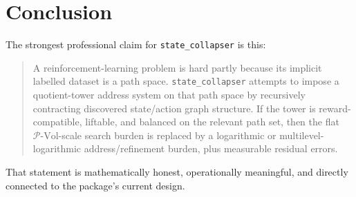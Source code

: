 \documentclass[11pt]{article}
\newcommand{\PVol}{\mathcal{P}\text{-}\mathrm{Vol}}
\begin{document}
\section{Conclusion}

The strongest professional claim for \texttt{state\_collapser} is this:

\begin{quote}
A reinforcement-learning problem is hard partly because its implicit labelled dataset is a path space.  \texttt{state\_collapser} attempts to impose a quotient-tower address system on that path space by recursively contracting discovered state/action graph structure.  If the tower is reward-compatible, liftable, and balanced on the relevant path set, then the flat \(\PVol\)-scale search burden is replaced by a logarithmic or multilevel-logarithmic address/refinement burden, plus measurable residual errors.
\end{quote}

That statement is mathematically honest, operationally meaningful, and directly connected to the package's current design.



\end{document}
